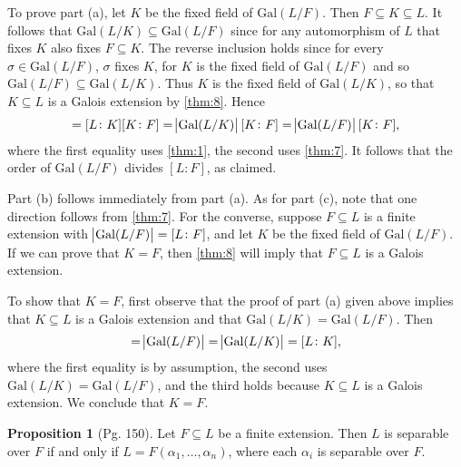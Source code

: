 \documentclass[leqno]{article}
\makeatletter
\theoremstyle{definition}
\newtheorem{prop}{Proposition}
\theoremstyle{remark}
\let\oldproofname=\proofname
\renewcommand{\proofname}{\textit{\oldproofname}}
\theoremstyle{definition}
\renewenvironment{proof}[1][\proofname]{\par
  \pushQED{\qed}%
  \normalfont \topsep6\p@\@plus6\p@\relax
  \list{}{\leftmargin=0mm
          \rightmargin=0mm
          \settowidth{\itemindent}{\itshape#1}%
          \labelwidth=\itemindent
          \parsep=0pt \listparindent=0mm%
  }
  \item[\hskip\labelsep
        \itshape
    #1\@addpunct{.}]\ignorespaces
}{%
  \popQED\endlist\@endpefalse
}
\makeatother
\begin{document}
        \begin{proof}
            To prove part (a), let $K$ be the fixed field of $\text{Gal}(L/F)$. Then $F\subseteq K\subseteq L$. It follows that $\text{Gal}(L/K)\subseteq\text{Gal}(L/F)$ since for any automorphism of $L$ that fixes $K$ also fixes $F\subseteq K$. The reverse inclusion holds since for every $\sigma\in\text{Gal}(L/F)$, $\sigma$ fixes $K$, for $K$ is the fixed field of $\text{Gal}(L/F)$ and so $\text{Gal}(L/F)\subseteq\text{Gal}(L/K)$. Thus $K$ is the fixed field of $\text{Gal}(L/K)$, so that $K\subseteq L$ is a Galois extension by \cref{thm:8}. Hence
                \begin{equation*}
                    [L\colon F]=[L\colon K][K\colon F]=\abs{\text{Gal}(L/K)}[K\colon F]=\abs{\text{Gal}(L/F)}[K\colon F],
                \end{equation*}
            where the first equality uses \cref{thm:1}, the second uses \cref{thm:7}. It follows that the order of $\text{Gal}(L/F)$ divides $[L\colon F]$, as claimed.\par\hspace{4mm} Part (b) follows immediately from part (a). As for part (c), note that one direction follows from \cref{thm:7}. For the converse, suppose $F\subseteq L$ is a finite extension with $\abs{\text{Gal}(L/F)}=[L\colon F]$, and let $K$ be the fixed field of $\text{Gal}(L/F)$. If we can prove that $K=F$, then \cref{thm:8} will imply that $F\subseteq L$ is a Galois extension.\par\hspace{4mm} To show that $K=F$, first observe that the proof of part (a) given above implies that $K\subseteq L$ is a Galois extension and that $\text{Gal}(L/K)=\text{Gal}(L/F)$. Then
                \begin{equation*}
                    [L\colon F]=\abs{\text{Gal}(L/F)}=\abs{\text{Gal}(L/K)}=[L\colon K],
                \end{equation*}
            where the first equality is by assumption, the second uses $\text{Gal}(L/K)=\text{Gal}(L/F)$, and the third holds because $K\subseteq L$ is a Galois extension. We conclude that $K=F$.
        \end{proof}
    \begin{prop}[Pg. 150]\label{prop:8}
        Let $F\subseteq L$ be a finite extension. Then $L$ is separable over $F$ if and only if $L=F(\alpha_1,\dots,\alpha_n)$, where each $\alpha_i$ is separable over $F$.
    \end{prop}
\end{document}
